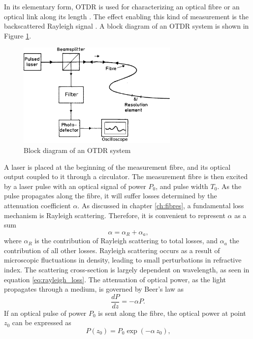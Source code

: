 \documentclass{standalone}
\begin{document}
In its elementary form, OTDR is used for characterizing an optical fibre or an optical link along its length \cite{UnderstandingOTDRs2000}. The effect enabling this kind of measurement is the backscattered Rayleigh signal \cite{epflBookRayleigh}. A block diagram of an OTDR system is shown in Figure \ref{fig:otdr_block}.
\begin{figure}[h]
	\centering
	\includegraphics[width=0.7\textwidth]{otdr_block.png}
	\caption{Block diagram of an OTDR system \cite{Rogers1999}}
	\label{fig:otdr_block}
\end{figure}
A laser is placed at the beginning of the measurement fibre, and its optical output coupled to it through a circulator. The measurement fibre is then excited by a laser pulse with an optical signal of power $P_0$, and pulse width $T_0$. As the pulse propagates along the fibre, it will suffer losses determined by the attenuation coefficient $\alpha$. As discussed in chapter \ref{ch:fibres}, a fundamental loss mechanism is Rayleigh scattering. Therefore, it is convenient to represent $\alpha$ as a sum \cite{agrawal}
\begin{equation}
\alpha = \alpha_R + \alpha_a \textrm{,}
\end{equation}
where $\alpha_R$ is the contribution of Rayleigh scattering to total losses, and $\alpha_a$ the contribution of all other losses. Rayleigh scattering occurs as a result of microscopic fluctuations in density, leading to small perturbations in refractive index. The scattering cross-section is largely dependent on wavelength, as seen in equation \ref{eq:rayleigh_loss}. The attenuation of optical power, as the light propagates through a medium, is governed by Beer's law as
\begin{equation}
\frac{dP}{dz} = -\alpha P \textrm{.}
\end{equation}
If an optical pulse of power $P_0$ is sent along the fibre, the optical power at point $z_0$ can be expressed as
\begin{equation}
P(z_0) = P_0 \exp\left(-\alpha \, z_0\right) \textrm{,}
\end{equation}
\end{document}
